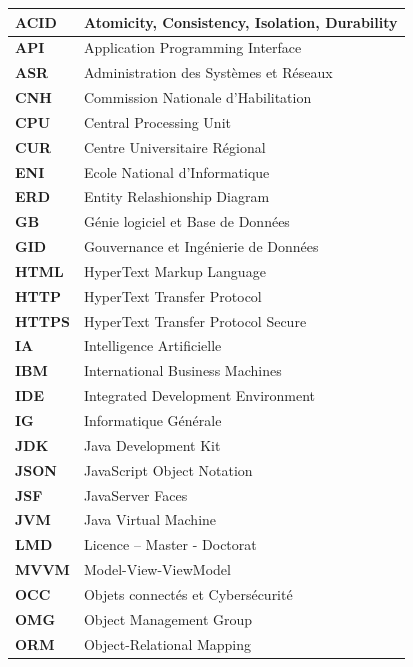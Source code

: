 \documentclass[12pt]{report}
\begin{document}
			\begin{longtable}{|p{4cm}|p{10cm}|} 
			\hline
			\textbf{ACID} & Atomicity, Consistency, Isolation, Durability\\
			\hline
			\textbf{API} & Application Programming Interface\\
			\hline
			\textbf{ASR} & Administration des Systèmes et Réseaux\\
			\hline
			\textbf{CNH} & Commission Nationale d’Habilitation\\
			\hline
			\textbf{CPU} & Central Processing Unit\\
			\hline
			\textbf{CUR} & Centre Universitaire Régional\\
			\hline
			\textbf{ENI} & Ecole National d'Informatique\\
			\hline
			\textbf{ERD} & Entity Relashionship Diagram\\
			\hline
			\textbf{GB} & Génie logiciel et Base de Données\\
			\hline
			\textbf{GID} & Gouvernance et Ingénierie de Données\\
			\hline
			\textbf{HTML} & HyperText Markup Language\\
			\hline
			\textbf{HTTP} & HyperText Transfer Protocol\\
			\hline
			\textbf{HTTPS} & HyperText Transfer Protocol Secure\\
			\hline
			\textbf{IA} & Intelligence Artificielle\\
			\hline
			\textbf{IBM} & International Business Machines\\
			\hline
			\textbf{IDE} & Integrated Development Environment\\
			\hline
			\textbf{IG} & Informatique Générale\\
			\hline
			\textbf{JDK} & Java Development Kit\\
			\hline
			\textbf{JSON} & JavaScript Object Notation\\
			\hline
			\textbf{JSF} & JavaServer Faces\\
			\hline
			\textbf{JVM} & Java Virtual Machine\\
			\hline
			\textbf{LMD} & Licence – Master - Doctorat\\
			\hline
			\textbf{MVVM} & Model-View-ViewModel\\
			\hline
			\textbf{OCC} & Objets connectés et Cybersécurité\\
			\hline
			\textbf{OMG} & Object Management Group\\
			\hline
			\textbf{ORM} & Object-Relational Mapping\\

\end{longtable}
\end{document}
